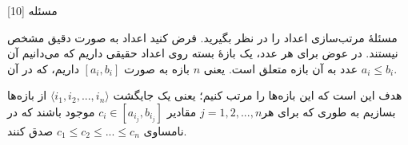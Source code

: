 ‌مسئله [10]


% 
%
%
% 
مسئله‌ٔ مرتب‌سازی اعداد را در نظر بگیرید. فرض کنید اعداد به صورت دقیق مشخص نیستند. در عوض برای هر عدد، یک بازه‌ٔ بسته روی اعداد حقیقی داریم که می‌دانیم آن عدد به آن بازه متعلق است. یعنی $n$ بازه به صورت $\left[ a_i, b_i \right]$ داریم، که در آن $a_i \le b_i$. 

هدف این است که این بازه‌ها را مرتب کنیم؛ یعنی یک جایگشت $\langle i_1, i_2,..., i_n \rangle$ از بازه‌ها بسازیم به طوری که برای هر\linebreak $j = 1, 2, ..., n$ مقادیر $c_i \in \left[a_{i_j}, b_{i_j}\right]$ موجود باشند که در نامساوی $c_1 \le c_2 \le ...\le c_n$ صدق کنند.

